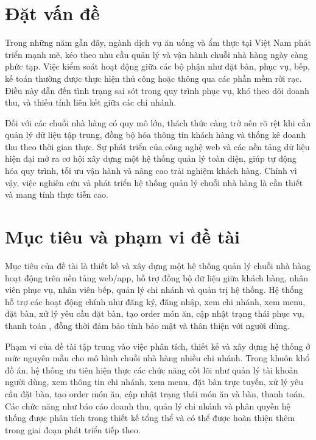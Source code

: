 \documentclass[../DoAn.tex]{subfiles}
\begin{document}
\section{Đặt vấn đề}
\label{section:1.1}
Trong những năm gần đây, ngành dịch vụ ăn uống và ẩm thực tại Việt Nam phát triển mạnh mẽ, kéo theo nhu cầu quản lý và vận hành chuỗi nhà hàng ngày càng phức tạp. Việc kiểm soát hoạt động giữa các bộ phận như đặt bàn, phục vụ, bếp,  kế toán thường được thực hiện thủ công hoặc thông qua các phần mềm rời rạc. Điều này dẫn đến tình trạng sai sót trong quy trình phục vụ, khó theo dõi doanh thu, và thiếu tính liên kết giữa các chi nhánh.  

Đối với các chuỗi nhà hàng có quy mô lớn, thách thức càng trở nên rõ rệt khi cần quản lý dữ liệu tập trung, đồng bộ hóa thông tin khách hàng và thống kê doanh thu theo thời gian thực. Sự phát triển của công nghệ web và các nền tảng dữ liệu hiện đại mở ra cơ hội xây dựng một hệ thống quản lý toàn diện, giúp tự động hóa quy trình, tối ưu vận hành và nâng cao trải nghiệm khách hàng. Chính vì vậy, việc nghiên cứu và phát triển hệ thống quản lý chuỗi nhà hàng là cần thiết và mang tính thực tiễn cao.

\section{Mục tiêu và phạm vi đề tài}
\label{section:1.2}
  
Mục tiêu của đề tài là thiết kế và xây dựng một hệ thống quản lý chuỗi nhà hàng hoạt động trên nền tảng web/app, hỗ trợ đồng bộ dữ liệu giữa khách hàng, nhân viên phục vụ, nhân viên bếp, quản lý chi nhánh và quản trị hệ thống. Hệ thống hỗ trợ các hoạt động chính như đăng ký, đăng nhập, xem chi nhánh, xem menu, đặt bàn, xử lý yêu cầu đặt bàn, tạo order món ăn, cập nhật trạng thái phục vụ, thanh toán , đồng thời đảm bảo tính bảo mật và thân thiện với người dùng.

Phạm vi của đề tài tập trung vào việc phân tích, thiết kế và xây dựng hệ thống ở mức nguyên mẫu cho mô hình chuỗi nhà hàng nhiều chi nhánh. Trong khuôn khổ đồ án, hệ thống ưu tiên hiện thực các chức năng cốt lõi như quản lý tài khoản người dùng, xem thông tin chi nhánh, xem menu, đặt bàn trực tuyến, xử lý yêu cầu đặt bàn, tạo order món ăn, cập nhật trạng thái món ăn và bàn, thanh toán. Các chức năng như báo cáo doanh thu, quản lý chi nhánh và phân quyền hệ thống được phân tích trong thiết kế tổng thể và có thể được hoàn thiện thêm trong giai đoạn phát triển tiếp theo.
\end{document}
